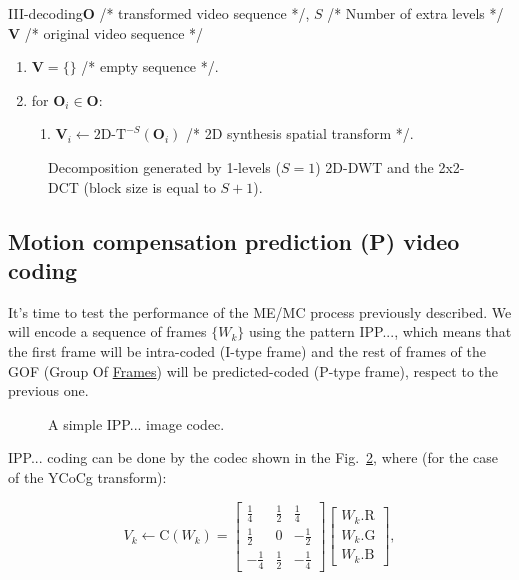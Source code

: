\begin{myalg}{III-decoding}{$\mathbf{O}$ /* transformed video sequence */, $S$ /* Number of extra levels */}{$\mathbf{V}$ /* original video sequence */}
  \label{alg:III_decoding}
  \begin{enumerate}
  \item ${\mathbf V}=\{\}$ /* empty sequence */.
  \item for ${\mathbf O}_i\in {\mathbf O}$:
    \begin{enumerate}
    \item ${\mathbf V}_i\leftarrow\text{2D-T}^{-S}({\mathbf O}_i)$ /* 2D synthesis spatial transform */.
    \end{enumerate}
  \end{enumerate}
\end{myalg}

\begin{figure}
  \centering
  \caption{Decomposition generated by 1-levels ($S=1$) 2D-DWT and the 2x2-DCT (block size is equal to $S+1$).}
  \label{fig:III}
\end{figure}

\subsection{Motion compensation prediction (P) video coding}

It's time to test the performance of the ME/MC process previously
described. We will encode a sequence of frames $\{W_k\}$ using the
pattern IPP..., which means that the first frame will be intra-coded
(I-type frame) and the rest of frames of the GOF (Group Of
\href{https://en.wikipedia.org/wiki/Group_of_pictures}{Frames}) will
be predicted-coded (P-type frame), respect to the previous one.

\begin{figure}
  \centering
  \caption{A simple IPP... image codec.}
\label{fig:IPP_codec}
\end{figure}

IPP... coding can be done by the codec shown in the
Fig.~\ref{fig:IPP_codec}, where (for the case of the YCoCg transform):

\begin{equation}
  V_k \leftarrow \text{C}(W_k) =
  \begin{bmatrix}
    \frac{1}{4} &  \frac{1}{2}  &  \frac{1}{4} \\ 
    \frac{1}{2} &            0  & -\frac{1}{2} \\
    -\frac{1}{4} &  \frac{1}{2}  & -\frac{1}{4}
  \end{bmatrix}
  \begin{bmatrix}
    W_k.\text{R} \\
    W_k.\text{G} \\
    W_k.\text{B}
  \end{bmatrix}
  , \tag{a}
\end{equation}

